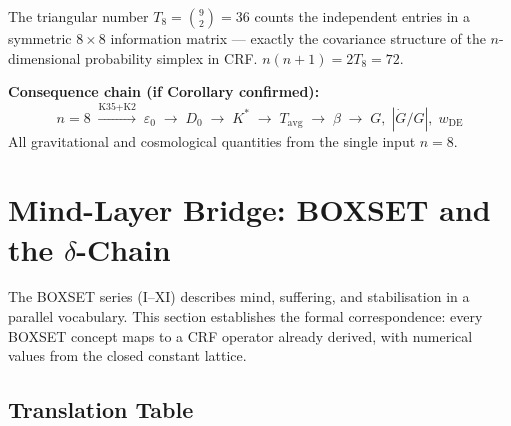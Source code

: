 \documentclass[12pt, a4paper]{article}
\begin{document}
The triangular number $T_8 = \binom{9}{2} = 36$ counts the independent entries in a symmetric
$8\times 8$ information matrix --- exactly the covariance structure of the $n$-dimensional
probability simplex in CRF. $n(n+1) = 2T_8 = 72$.

\textbf{Consequence chain (if Corollary confirmed):}
\[
  n = 8 \;\xrightarrow{\text{K35+K2}}\; \varepsilon_0
  \;\to\; D_0 \;\to\; K^* \;\to\; T_{\mathrm{avg}} \;\to\; \beta
  \;\to\; G,\;|\dot{G}/G|,\;w_{\mathrm{DE}}
\]
All gravitational and cosmological quantities from the single input $n=8$.

\section{Mind-Layer Bridge: BOXSET and the $\delta$-Chain}

The BOXSET series (I--XI) describes mind, suffering, and stabilisation in a parallel
vocabulary. This section establishes the formal correspondence: every BOXSET concept
maps to a CRF operator already derived, with numerical values from the closed constant lattice.

\subsection{Translation Table}
\end{document}
